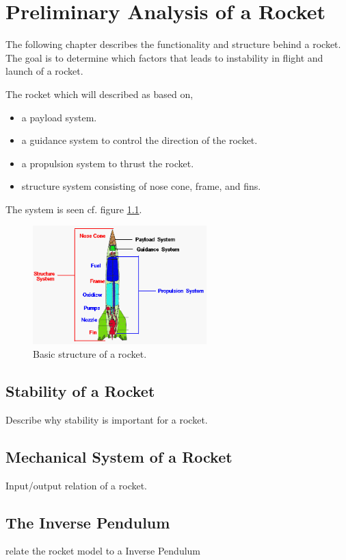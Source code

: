 \chapter{Preliminary Analysis of a Rocket}
The following chapter describes the functionality and structure behind a rocket. The goal is to determine which factors that leads to instability in flight and launch of a rocket. 
\bigbreak

The rocket which will described as based on,
\begin{itemize}[noitemsep]
\item a payload system.
\item a guidance system to control the direction of the rocket.
\item a propulsion system to thrust the rocket. 
\item structure system consisting of nose cone, frame, and fins.
\end{itemize}    
The system is seen cf. figure \ref{fig:RocketStructure}.
\begin{figure}[htbp]
	\centering
 	\includegraphics[width=0.6\textwidth]{figures/RocketStructure.png} 
 	\caption{Basic structure of a rocket.}
 	\label{fig:RocketStructure}
\end{figure}


\section{Stability of a Rocket}
Describe why stability is important for a rocket. 
\section{Mechanical System of a Rocket}
Input/output relation of a rocket.
\section{The Inverse Pendulum}
relate the rocket model to a Inverse Pendulum